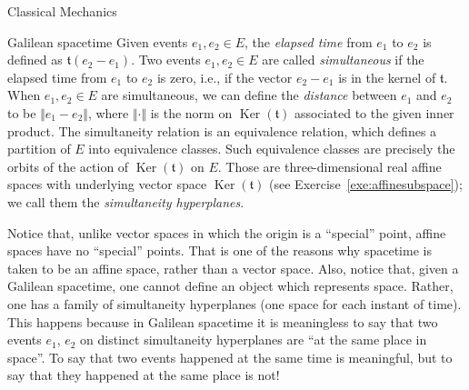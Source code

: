 \documentclass[oneside,a4paper,11pt]{amsbook}
\DeclareMathOperator{\Ker}{Ker}
\theoremstyle{remark}\newtheorem{exercise}{Exercise}[chapter]
\theoremstyle{plain}\newtheorem{teo}{Theorem}[section]
\theoremstyle{plain}\newtheorem{lem}[teo]{Lemma}
\theoremstyle{plain}\newtheorem{prop}[teo]{Proposition}
\theoremstyle{plain}\newtheorem{cor}[teo]{Corollary}
\theoremstyle{definition}\newtheorem{defin}[teo]{Definition}
\theoremstyle{remark}\newtheorem{rem}[teo]{Remark}
\theoremstyle{definition}\newtheorem{notation}[teo]{Notation}
\theoremstyle{definition}\newtheorem{convention}[teo]{Convention}
\theoremstyle{definition}\newtheorem{example}[teo]{Example}
\numberwithin{section}{chapter}
\numberwithin{equation}{section}
\begin{document}
\begin{chapter}{Classical Mechanics}
\begin{section}{Galilean spacetime}
Given events $e_1,e_2\in E$, the {\em elapsed time\/} from $e_1$ to $e_2$ is defined as $\mathfrak t(e_2-e_1)$.
Two events $e_1,e_2\in E$ are called {\em simultaneous\/} if the elapsed time from $e_1$ to $e_2$ is zero,
i.e., if the vector $e_2-e_1$ is in the kernel of $\mathfrak t$. When
$e_1, e_2\in E$ are simultaneous, we can define the {\em distance\/} between $e_1$ and $e_2$ to be $\Vert e_1-e_2\Vert$,
where $\Vert\cdot\Vert$ is the norm on $\Ker(\mathfrak t)$ associated to the given inner product. The simultaneity
relation is an equivalence relation, which defines a partition of $E$ into equivalence classes. Such equivalence classes
are precisely the orbits of the action of $\Ker(\mathfrak t)$ on $E$. Those are three-dimensional real affine spaces with underlying vector space
$\Ker(\mathfrak t)$ (see Exercise~\ref{exe:affinesubspace}); we call them the {\em simultaneity hyperplanes}.

Notice that, unlike vector spaces in which the origin is a ``special'' point, affine spaces have no ``special'' points.
That is one of the reasons why spacetime is taken to be an affine space, rather than a vector space.
Also, notice that, given a Galilean
spacetime, one cannot define an object which represents space. Rather, one has a family of simultaneity hyperplanes
(one space for each instant of time). This happens because in Galilean spacetime it is meaningless to say
that two events $e_1$, $e_2$ on distinct simultaneity hyperplanes are ``at the same place
in space''. To say that two events happened at the same time is meaningful, but to say that they happened at the
same place is not!


\end{section}
\end{chapter}
\end{document}
